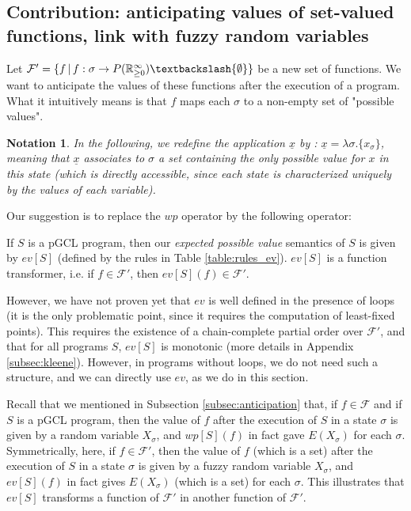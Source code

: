 \documentclass[a4paper,10pt]{llncs}
\newtheorem{notation}{Notation}
\def\RRposi {{\mathbb R_{\geq 0}^{\infty}}}
\begin{document}
\subsection{Contribution: anticipating values of set-valued functions, link with fuzzy random variables}
Let $\mathcal{F}' = \{f \,|\, f : \sigma \rightarrow P(\RRposi)\textbackslash\{\emptyset\} \}$ be a new set of functions. We want to anticipate the values of these functions after the execution of a program. What it intuitively means is that $f$ maps each $\sigma$ to a non-empty set of "possible values". 
\begin{notation}
In the following, we redefine the application $\underline{x}$ by : $\underline{x} = \lambda\sigma. \{x_\sigma\}$, meaning that $\underline{x}$ associates to $\sigma$ a set containing the only possible value for $x$ in this state (which is directly accessible, since each state is characterized uniquely by the values of each variable).
\end{notation}

Our suggestion is to replace the $wp$ operator by the following operator:
\begin{definition}
 	If $S$ is a pGCL program, then our \emph{expected possible value} semantics of $S$ is given by $ev[S]$ (defined by the rules in Table \ref{table:rules_ev}).\newline
	$ev[S]$ is a function transformer, i.e. if $f \in \mathcal{F}'$, then $ev[S](f) \in \mathcal{F}'$.
\end{definition}

However, we have not proven yet that $ev$ is well defined in the presence of loops (it is the only problematic point, since it requires the computation of least-fixed points). This requires the existence of a chain-complete partial order over $\mathcal{F}'$, and that for all programs $S$, $ev[S]$ is monotonic (more details in Appendix \ref{subsec:kleene}). However, in programs without loops, we do not need such a structure, and we can directly use $ev$, as we do in this section.\bigskip

Recall that we mentioned in Subsection \ref{subsec:anticipation} that, if $f \in \mathcal{F}$ and if $S$ is a pGCL program, then the value of $f$ after the execution of $S$ in a state $\sigma$ is given by a random variable $X_\sigma$, and $wp[S](f)$ in fact gave $E(X_\sigma)$ for each $\sigma$.\newline
Symmetrically, here, if $f \in \mathcal{F}'$, then the value of $f$ (which is a set) after the execution of $S$ in a state $\sigma$ is given by a fuzzy random variable $X_\sigma$, and $ev[S](f)$ in fact gives $E(X_\sigma)$ (which is a set) for each $\sigma$. This illustrates that $ev[S]$ transforms a function of $\mathcal{F}'$ in another function of $\mathcal{F}'$.\newline
\end{document}
